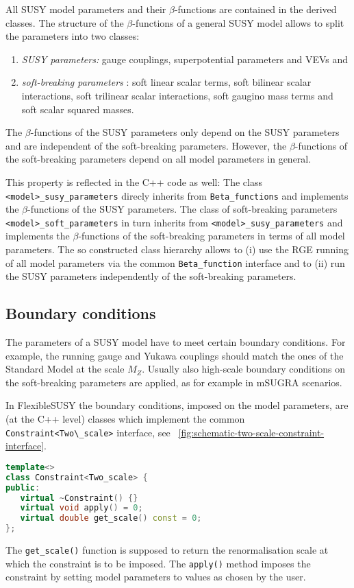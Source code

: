 \documentclass[final,3p,11pt,pdflatex]{elsarticle}
\makeatletter
\newcommand{\fs}{FlexibleSUSY\@\xspace}
\newcommand{\code}[1]{\lstinline|#1|}  %
\newcommand{\figref}[1]{\figurename~\ref{#1}}
\makeatother
\begin{document}
All SUSY model parameters and their $\beta$-functions are contained in
the derived classes.  The structure of the $\beta$-functions of a
general SUSY model
\cite{Jones:1974pg,Jones:1983vk,West:1984dg,Martin:1993yx,Yamada:1993ga,MV94,Fonseca:2011vn,Sperling:2013eva,Sperling:2013xqa}
allows to split the parameters into two classes:
%
\begin{enumerate}
\item \emph{SUSY parameters:} gauge couplings, superpotential
  parameters and VEVs and
\item \emph{soft-breaking parameters} \cite{Girardello:1981wz}: soft
  linear scalar terms, soft bilinear scalar interactions, soft
  trilinear scalar interactions, soft gaugino mass terms and soft
  scalar squared masses.
\end{enumerate}
%
The $\beta$-functions of the SUSY parameters only depend on the
SUSY parameters and are independent of the soft-breaking
parameters.  However, the $\beta$-functions of the soft-breaking
parameters depend on all model parameters in general.

This property is reflected in the C++ code as well: The class
\code{<model>_susy_parameters} direcly inherits from
\code{Beta_functions} and implements the $\beta$-functions of the SUSY
parameters.  The class of soft-breaking parameters
\code{<model>_soft_parameters} in turn inherits from
\code{<model>_susy_parameters} and implements the $\beta$-functions of
the soft-breaking parameters in terms of all model parameters.  The so
constructed class hierarchy allows to (i) use the RGE running of all
model parameters via the common \code{Beta_function} interface and to
(ii) run the SUSY parameters independently of the soft-breaking
parameters.

\subsection{Boundary conditions}
\label{sec:boundary-conditions}

The parameters of a SUSY model have to meet certain boundary
conditions.  For example, the running gauge and Yukawa couplings
should match the ones of the Standard Model at the scale $M_Z$.
Usually also high-scale boundary conditions on the soft-breaking
parameters are applied, as for example in mSUGRA scenarios.

In \fs the boundary conditions, imposed on the model parameters, are
(at the C++ level) classes which implement the common
\code{Constraint<Two\_scale>} interface, see
\figref{fig:schematic-two-scale-constraint-interface}.
%
\begin{lstlisting}[language=C++]
template<>
class Constraint<Two_scale> {
public:
   virtual ~Constraint() {}
   virtual void apply() = 0;
   virtual double get_scale() const = 0;
};
\end{lstlisting}
%
The \code{get_scale()} function is supposed to return the
renormalisation scale at which the constraint is to be imposed.  The
\code{apply()} method imposes the constraint by setting model
parameters to values as chosen by the user.
\end{document}

